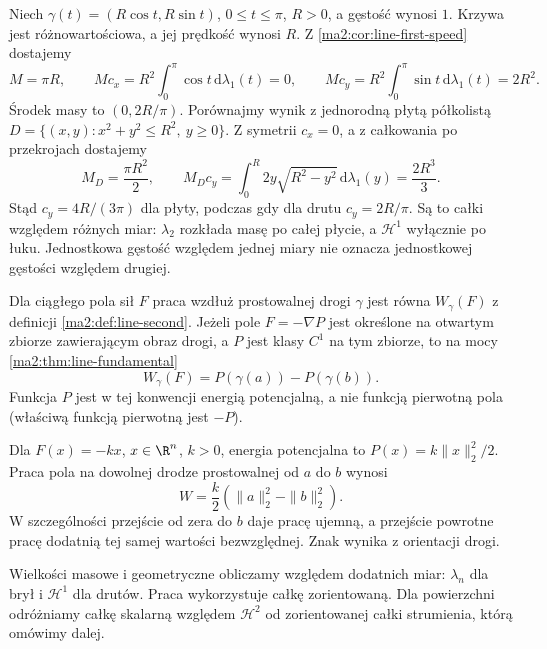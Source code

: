 \begin{przyklad}
\label{ma2:ex:applications-wire}
Niech $\gamma(t)=(R\cos t,R\sin t)$,
$0\le t\le\pi$, $R>0$, a gęstość wynosi $1$.
Krzywa jest różnowartościowa, a jej
prędkość wynosi $R$. Z
\ref{ma2:cor:line-first-speed} dostajemy
\[
 M=\pi R,\qquad
 Mc_x=R^2\int_0^\pi\cos t\,\mathrm d\lambda_1(t)=0,
 \qquad
 Mc_y=R^2\int_0^\pi\sin t\,\mathrm d\lambda_1(t)=2R^2.
\]
Środek masy to $(0,2R/\pi)$.
Porównajmy wynik z jednorodną płytą półkolistą
$D=\{(x,y):x^2+y^2\le R^2,\ y\ge0\}$.
Z symetrii $c_x=0$, a z całkowania po
przekrojach dostajemy
\[
 M_D=\frac{\pi R^2}{2},\qquad
 M_D c_y=\int_0^R 2y\sqrt{R^2-y^2}\,
 \mathrm d\lambda_1(y)=\frac{2R^3}{3}.
\]
Stąd $c_y=4R/(3\pi)$ dla płyty, podczas
gdy dla drutu $c_y=2R/\pi$.
Są to całki względem różnych miar:
$\lambda_2$ rozkłada masę po całej płycie,
a $\mathcal H^1$ wyłącznie po łuku.
Jednostkowa gęstość względem jednej miary
nie oznacza jednostkowej gęstości względem
drugiej.
\end{przyklad}

Dla ciągłego pola sił $F$ praca wzdłuż
prostowalnej drogi $\gamma$ jest równa
$W_\gamma(F)$ z definicji
\ref{ma2:def:line-second}.
Jeżeli pole $F=-\nabla P$ jest określone na
otwartym zbiorze zawierającym obraz drogi,
a $P$ jest klasy $C^1$ na tym zbiorze,
to na mocy
\ref{ma2:thm:line-fundamental}
\[
 W_\gamma(F)=P(\gamma(a))-P(\gamma(b)).
\]
Funkcja $P$ jest w tej konwencji energią
potencjalną, a nie funkcją pierwotną pola
(właściwą funkcją pierwotną jest $-P$).

\begin{przyklad}
\label{ma2:ex:applications-spring}
Dla $F(x)=-kx$, $x\in\R^n$, $k>0$,
energia potencjalna to $P(x)=k\|x\|_2^2/2$.
Praca pola na dowolnej drodze prostowalnej
od $a$ do $b$ wynosi
\[
 W=\frac{k}{2}(\|a\|_2^2-\|b\|_2^2).
\]
W szczególności przejście od zera do $b$
daje pracę ujemną, a przejście powrotne
pracę dodatnią tej samej wartości bezwzględnej.
Znak wynika z orientacji drogi.
\end{przyklad}

Wielkości masowe i geometryczne obliczamy
względem dodatnich miar: $\lambda_n$ dla
brył i $\mathcal H^1$ dla drutów.
Praca wykorzystuje całkę zorientowaną.
Dla powierzchni odróżniamy całkę skalarną
względem $\mathcal H^2$ od zorientowanej
całki strumienia, którą omówimy dalej.

